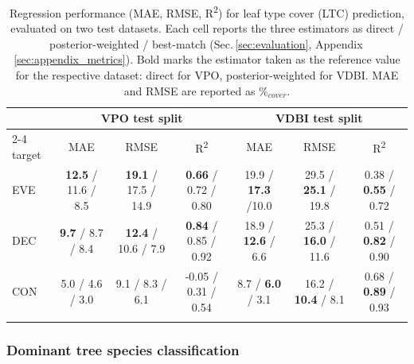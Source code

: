 \documentclass[essd, manuscript]{copernicus}
\begin{document}
\begin{table}[t]
\caption{Regression performance (MAE, RMSE, R\textsuperscript{2}) for leaf type cover (LTC) prediction, evaluated on two test datasets. Each cell reports the three estimators as direct / posterior-weighted / best-match
(Sec.\,\ref{sec:evaluation}, Appendix\,\ref{sec:appendix_metrics}). Bold marks the
estimator taken as the reference value for the respective dataset: direct for VPO,
posterior-weighted for VDBI. MAE and RMSE are reported as $\%_{cover}$.}
\label{tab:regression_report}
\begin{tabular}{l ccc ccc}
\tophline
 & \multicolumn{3}{c}{VPO test split} & \multicolumn{3}{c}{VDBI test split} \\
\cline{2-4} \cline{5-7}
target & MAE & RMSE & R\textsuperscript{2} & MAE & RMSE & R\textsuperscript{2} \\
\middlehline
EVE & \textbf{12.5} / 11.6 / 8.5 & \textbf{19.1} / 17.5 / 14.9 & \textbf{0.66} / 0.72 / 0.80 & 19.9 / \textbf{17.3} /10.0 & 29.5 / \textbf{25.1} / 19.8 & 0.38 / \textbf{0.55} / 0.72 \\
DEC & \textbf{9.7} / 8.7 / 8.4 & \textbf{12.4} / 10.6 / 7.9 & \textbf{0.84} / 0.85 / 0.92 & 18.9 / \textbf{12.6} / 6.6 & 25.3 / \textbf{16.0} / 11.6 & 0.51 / \textbf{0.82} / 0.90 \\
CON & 5.0 / 4.6 / 3.0 & 9.1 / 8.3 / 6.1 & -0.05 / 0.31 / 0.54 & 8.7 / \textbf{6.0} / 3.1 & 16.2 / \textbf{10.4} / 8.1 & 0.68 / \textbf{0.89} / 0.93 \\
\bottomhline
\end{tabular}
\end{table}


\subsubsection{Dominant tree species classification}
\end{document}
